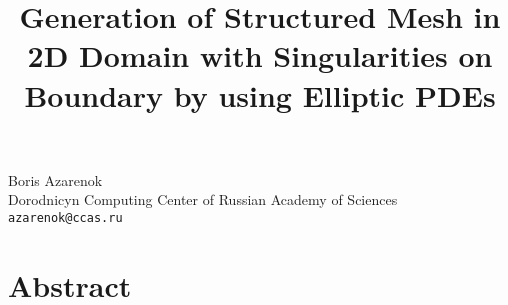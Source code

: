 \title{Generation of Structured Mesh in 2D Domain with Singularities on Boundary by using Elliptic PDEs}
\author{} \institute{}
\maketitle

\begin{center}
{\large Boris Azarenok}\\
Dorodnicyn Computing Center of Russian Academy of Sciences\\
{\tt azarenok@ccas.ru}
\end{center}

\section*{Abstract}
